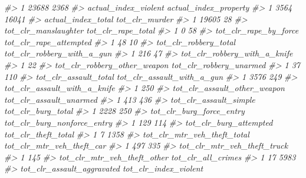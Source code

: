 \documentclass[
  12pt,
  openany]{book}
\newenvironment{Shaded}{\begin{snugshade}}{\end{snugshade}}
\newcommand{\CommentTok}[1]{\textcolor[rgb]{0.37,0.37,0.37}{\textit{#1}}}
\begin{document}
\begin{Shaded}
\begin{Highlighting}[]
\CommentTok{\#\textgreater{} 1             23688                      2368}
\CommentTok{\#\textgreater{}   actual\_index\_violent actual\_index\_property}
\CommentTok{\#\textgreater{} 1                 3564                 16041}
\CommentTok{\#\textgreater{}   actual\_index\_total tot\_clr\_murder}
\CommentTok{\#\textgreater{} 1              19605             28}
\CommentTok{\#\textgreater{}   tot\_clr\_manslaughter tot\_clr\_rape\_total}
\CommentTok{\#\textgreater{} 1                    0                 58}
\CommentTok{\#\textgreater{}   tot\_clr\_rape\_by\_force tot\_clr\_rape\_attempted}
\CommentTok{\#\textgreater{} 1                    48                     10}
\CommentTok{\#\textgreater{}   tot\_clr\_robbery\_total tot\_clr\_robbery\_with\_a\_gun}
\CommentTok{\#\textgreater{} 1                   216                         47}
\CommentTok{\#\textgreater{}   tot\_clr\_robbery\_with\_a\_knife}
\CommentTok{\#\textgreater{} 1                           22}
\CommentTok{\#\textgreater{}   tot\_clr\_robbery\_other\_weapon tot\_clr\_robbery\_unarmed}
\CommentTok{\#\textgreater{} 1                           37                     110}
\CommentTok{\#\textgreater{}   tot\_clr\_assault\_total tot\_clr\_assault\_with\_a\_gun}
\CommentTok{\#\textgreater{} 1                  3576                        249}
\CommentTok{\#\textgreater{}   tot\_clr\_assault\_with\_a\_knife}
\CommentTok{\#\textgreater{} 1                          250}
\CommentTok{\#\textgreater{}   tot\_clr\_assault\_other\_weapon tot\_clr\_assault\_unarmed}
\CommentTok{\#\textgreater{} 1                          413                     436}
\CommentTok{\#\textgreater{}   tot\_clr\_assault\_simple tot\_clr\_burg\_total}
\CommentTok{\#\textgreater{} 1                   2228                250}
\CommentTok{\#\textgreater{}   tot\_clr\_burg\_force\_entry tot\_clr\_burg\_nonforce\_entry}
\CommentTok{\#\textgreater{} 1                      129                         114}
\CommentTok{\#\textgreater{}   tot\_clr\_burg\_attempted tot\_clr\_theft\_total}
\CommentTok{\#\textgreater{} 1                      7                1358}
\CommentTok{\#\textgreater{}   tot\_clr\_mtr\_veh\_theft\_total tot\_clr\_mtr\_veh\_theft\_car}
\CommentTok{\#\textgreater{} 1                         497                       335}
\CommentTok{\#\textgreater{}   tot\_clr\_mtr\_veh\_theft\_truck}
\CommentTok{\#\textgreater{} 1                         145}
\CommentTok{\#\textgreater{}   tot\_clr\_mtr\_veh\_theft\_other tot\_clr\_all\_crimes}
\CommentTok{\#\textgreater{} 1                          17               5983}
\CommentTok{\#\textgreater{}   tot\_clr\_assault\_aggravated tot\_clr\_index\_violent}

\end{Highlighting}
\end{Shaded}
\end{document}
